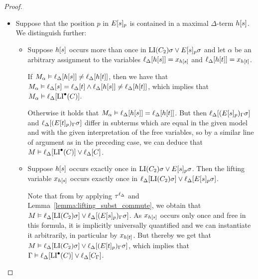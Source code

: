 \begin{proof}
\begin{description}
\begin{itemize}
				\item
					Suppose that the position $p$ in $E{[s]_{p}}$ is contained in a maximal $\Delta$-term $h[s]$.
					We distinguish further:

					\begin{itemize}
						\item Suppose $h[s]$ occurs more than once in $\operatorname{LI}(C_2)\sigma \lor E{[s]_{p}}\sigma$ and let $\alpha$ be an arbitrary assignment to the variables $\ell_{\Delta}[h[s]] = x_{h[s]}$ and $\ell_{\Delta}[h[t]] = x_{h[t]}$.

							If $M_\alpha \vDash \ell_{\Delta}[h[s]] \neq \ell_{\Delta}[h[t]]$, then we have that $M_\alpha \entails \lifdeltanovar{s}\nolinebreak=\lifdeltanovar{t} \land\allowbreak \lifdeltanovar{h\occ{s}} \neq \lifdeltanovar{h\occ{t}}$, which implies that $M_\alpha \vDash \ell_{\Delta}[\operatorname{LI}^\bullet(C)]$.

							Otherwise it holds that $M_\alpha \vDash \ell_{\Delta}[h[s]] = \ell_{\Delta}[h[t]]$.
							But then 
							$\ell_{\Delta}[(E{[s]_{p}})_\Gamma\sigma]$
							and
							$\ell_{\Delta}[(E{[t]_{p}})_\Gamma\sigma]$
							differ in subterms which are equal in the given model and with the given interpretation of the free variables,
							so by a similar line of argument as in the preceding case, we can deduce that $M \vDash \ell_{\Delta}[\operatorname{LI}^\bullet(C)] \lor \ell_{\Delta}[C]$.

						\item Suppose $h[s]$ occurs exactly once in $\operatorname{LI}(C_2)\sigma \lor E{[s]_{p}}\sigma$.
							Then the lifting variable $x_{h[s]}$
							occurs exactly once in $\ell_{\Delta}[\operatorname{LI}(C_2)\sigma] \lor \ell_{\Delta}[E{[s]_{p}}\sigma]$.

							Note that from \markB{} by applying $\tau^{\ell_\Delta}$ and Lemma~\ref{lemma:lifting_subst_commute}, we obtain that $M\vDash \ell_{\Delta}[\operatorname{LI}(C_2)\sigma] \lor \ell_{\Delta}[(E{[s]_{p}})_\Gamma\sigma]$.
							As $x_{h[s]}$ occurs only once and free in this formula, it is implicitly universally quantified and we can instantiate it arbitrarily, in particular by $x_{h[t]}$.
							But thereby we get that 
							$M\vDash \ell_{\Delta}[\operatorname{LI}(C_2)\sigma] \lor \ell_{\Delta}[(E{[t]_{p}})_\Gamma\sigma]$, 
							which implies that
							$\Gamma\vDash \ell_{\Delta}[\operatorname{LI}^\bullet(C)] \lor \ell_{\Delta}[C_\Gamma]$.
					\end{itemize}
			\end{itemize}
	\end{description}



\end{proof}

